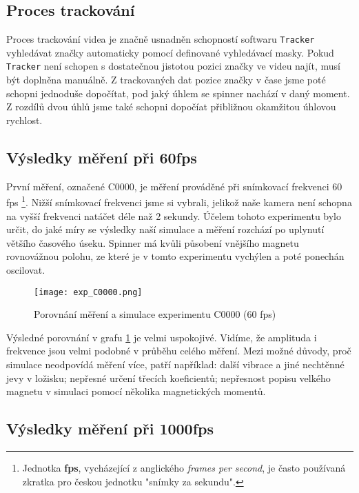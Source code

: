 \subsection{Proces trackování}

Proces trackování videa je značně usnadněn schopností softwaru \texttt{Tracker} vyhledávat značky automaticky pomocí definované vyhledávací masky. Pokud \texttt{Tracker} není schopen s dostatečnou jistotou pozici značky ve videu najít, musí být doplněna manuálně. Z trackovaných dat pozice značky v čase jsme poté schopni jednoduše dopočítat, pod jaký úhlem se spinner nachází v daný moment. Z rozdílů dvou úhlů jsme také schopni dopočíat přibližnou okamžitou úhlovou rychlost.

\subsection{Výsledky měření při 60fps}

První měření, označené C0000, je měření prováděné při snímkovací frekvenci 60 fps \footnote{Jednotka \textbf{fps}, vycházející z anglického \textit{frames per second}, je často používaná zkratka pro českou jednotku "snímky za sekundu".}.
Nižší snímkovací frekvenci jsme si vybrali, jelikož naše kamera není schopna na vyšší frekvenci natáčet déle naž 2 sekundy. Účelem tohoto experimentu bylo určit, do jaké míry se výsledky naší simulace a měření rozchází po uplynutí většího časového úseku. Spinner má kvůli působení vnějšího magnetu rovnovážnou polohu, ze které je v tomto experimentu vychýlen a poté ponechán oscilovat.

\begin{figure}[!ht]
    \texttt{[image: exp\_C0000.png]}
    \centering
    \caption{Porovnání měření a simulace experimentu C0000 (60 fps)}
    \label{fig:exp_C0000}
\end{figure}

Výsledné porovnání v grafu \ref{fig:exp_C0000} je velmi uspokojivé. Vidíme, že amplituda i frekvence jsou velmi podobné v průběhu celého měření. Mezi možné důvody, proč simulace neodpovídá měření více, patří například: další vibrace a jiné nechtěnné jevy v ložisku; nepřesné určení třecích koeficientů; nepřesnost popisu velkého magnetu v simulaci pomocí několika magnetických momentů.

\clearpage

\subsection{Výsledky měření při 1000fps}

